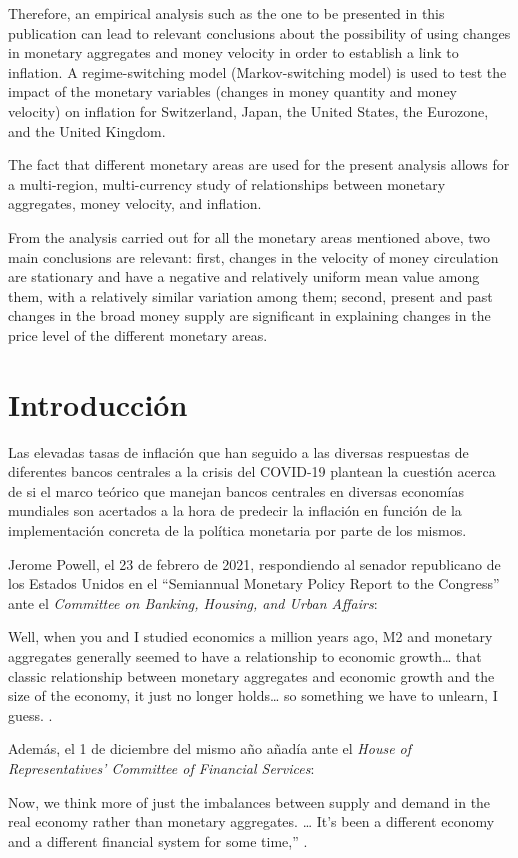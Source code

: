 \documentclass[titlepage, 12pt]{article}
\begin{document}
Therefore, an empirical analysis such as the one to be presented in this publication can lead to relevant conclusions about the possibility of using changes in monetary aggregates and money velocity in order to establish a link to inflation. A regime-switching model (Markov-switching model) is used to test the impact of the monetary variables (changes in money quantity and money velocity) on inflation for Switzerland, Japan, the United States, the Eurozone, and the United Kingdom.

The fact that different monetary areas are used for the present analysis allows for a multi-region, multi-currency study of relationships between monetary aggregates, money velocity, and inflation.

From the analysis carried out for all the monetary areas mentioned above, two main conclusions are relevant: first, changes in the velocity of money circulation are stationary and have a negative and relatively uniform mean value among them, with a relatively similar variation among them; second, present and past changes in the broad money supply are significant in explaining changes in the price level of the different monetary areas.

\newpage


\newpage
{}
\section{Introducción}
Las elevadas tasas de inflación que han seguido a las diversas respuestas de diferentes bancos centrales a la crisis del COVID-19 plantean la cuestión acerca de si el marco teórico que manejan bancos centrales en diversas economías mundiales son acertados a la hora de predecir la inflación en función de la implementación concreta de la política monetaria por parte de los mismos.

Jerome Powell, el 23 de febrero de 2021, respondiendo al senador republicano de los Estados Unidos en el \enquote{Semiannual Monetary Policy Report to the Congress} ante el \textit{Committee on Banking, Housing, and Urban Affairs}:
\begin{displayquote}
    Well, when you and I studied economics a million years ago, M2 and monetary aggregates generally seemed to have a relationship to economic growth… that classic relationship between monetary aggregates and economic growth and the size of the economy, it just no longer holds… so something we have to unlearn, I guess. \autocite{powell2021a}.
\end{displayquote}
Además, el 1 de diciembre del mismo año añadía ante el \textit{House of Representatives’ Committee of Financial Services}:
\begin{displayquote}
    Now, we think more of just the imbalances between supply and demand in the real economy rather than monetary aggregates. … It’s been a different economy and a different financial system for some time,” \autocite{powell2021b}.
\end{displayquote}
\end{document}
